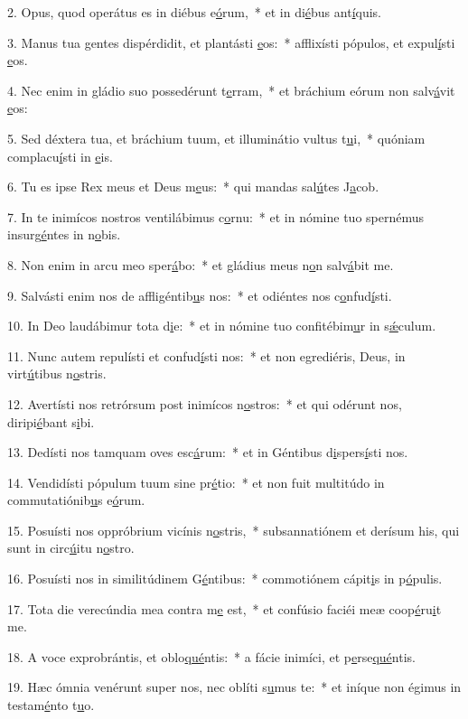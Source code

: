 2. Opus, quod operátus es in diébus e\uline{ó}rum,~* et in di\uline{é}bus ant\uline{í}quis.\par 
3. Manus tua gentes dispérdidit, et plantásti \uline{e}os:~* afflixísti pópulos, et expul\uline{í}sti \uline{e}os.\par 
4. Nec enim in gládio suo possedérunt t\uline{e}rram,~* et bráchium eórum non salv\uline{á}vit \uline{e}os:\par 
5. Sed déxtera tua, et bráchium tuum, et illuminátio vultus t\uline{u}i,~* quóniam complacu\uline{í}sti in \uline{e}is.\par 
6. Tu es ipse Rex meus et Deus m\uline{e}us:~* qui mandas sal\uline{ú}tes J\uline{a}cob.\par 
7. In te inimícos nostros ventilábimus c\uline{o}rnu:~* et in nómine tuo spernémus insurg\uline{é}ntes in n\uline{o}bis.\par 
8. Non enim in arcu meo sper\uline{á}bo:~* et gládius meus n\uline{o}n salv\uline{á}bit me.\par 
9. Salvásti enim nos de affligéntib\uline{u}s nos:~* et odiéntes nos c\uline{o}nfud\uline{í}sti.\par 
10. In Deo laudábimur tota d\uline{i}e:~* et in nómine tuo confitébim\uline{u}r in s\uline{ǽ}culum.\par 
11. Nunc autem repulísti et confud\uline{í}sti nos:~* et non egrediéris, Deus, in virt\uline{ú}tibus n\uline{o}stris.\par 
12. Avertísti nos retrórsum post inimícos n\uline{o}stros:~* et qui odérunt nos, diripi\uline{é}bant s\uline{i}bi.\par 
13. Dedísti nos tamquam oves esc\uline{á}rum:~* et in Géntibus d\uline{i}spers\uline{í}sti nos.\par 
14. Vendidísti pópulum tuum sine pr\uline{é}tio:~* et non fuit multitúdo in commutatiónib\uline{u}s e\uline{ó}rum.\par 
15. Posuísti nos oppróbrium vicínis n\uline{o}stris,~* subsannatiónem et derísum his, qui sunt in circ\uline{ú}itu n\uline{o}stro.\par 
16. Posuísti nos in similitúdinem G\uline{é}ntibus:~* commotiónem cápit\uline{i}s in p\uline{ó}pulis.\par 
17. Tota die verecúndia mea contra m\uline{e} est,~* et confúsio faciéi meæ coop\uline{é}ru\uline{i}t me.\par 
18. A voce exprobrántis, et oblo\uline{qué}ntis:~* a fácie inimíci, et p\uline{e}rse\uline{qué}ntis.\par 
19. Hæc ómnia venérunt super nos, nec oblíti s\uline{u}mus te:~* et iníque non égimus in testam\uline{é}nto t\uline{u}o.\par 
